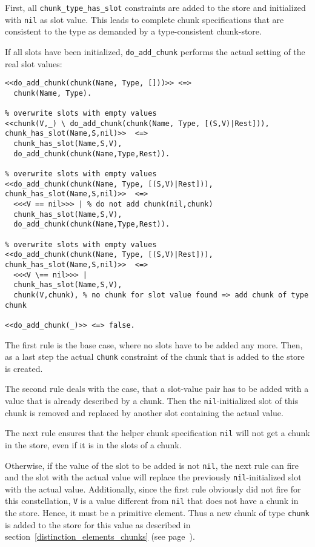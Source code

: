 First, all \lstinline|chunk_type_has_slot| constraints are added to the store and initialized with \lstinline|nil| as slot value. This leads to complete chunk specifications that are consistent to the type as demanded by a type-consistent chunk-store.

If all slots have been initialized, \lstinline|do_add_chunk| performs the actual setting of the real slot values:
  
\begin{lstlisting}[caption={Additional rules for adding chunks}]  
% base case
<<do_add_chunk(chunk(Name, Type, []))>> <=> 
  chunk(Name, Type). 

% overwrite slots with empty values
<<chunk(V,_) \ do_add_chunk(chunk(Name, Type, [(S,V)|Rest])), chunk_has_slot(Name,S,nil)>>  <=>
  chunk_has_slot(Name,S,V), 
  do_add_chunk(chunk(Name,Type,Rest)).

% overwrite slots with empty values  
<<do_add_chunk(chunk(Name, Type, [(S,V)|Rest])), chunk_has_slot(Name,S,nil)>>  <=> 
  <<<V == nil>>> | % do not add chunk(nil,chunk)
  chunk_has_slot(Name,S,V), 
  do_add_chunk(chunk(Name,Type,Rest)).  

% overwrite slots with empty values  
<<do_add_chunk(chunk(Name, Type, [(S,V)|Rest])), chunk_has_slot(Name,S,nil)>>  <=> 
  <<<V \== nil>>> |
  chunk_has_slot(Name,S,V), 
  chunk(V,chunk), % no chunk for slot value found => add chunk of type chunk 
  
<<do_add_chunk(_)>> <=> false.
\end{lstlisting}

The first rule is the base case, where no slots have to be added any more. Then, as a last step the actual \lstinline|chunk| constraint of the chunk that is added to the store is created.

The second rule deals with the case, that a slot-value pair has to be added with a value that is already described by a chunk. Then the \lstinline|nil|-initialized slot of this chunk is removed and replaced by another slot containing the actual value.

The next rule ensures that the helper chunk specification \lstinline|nil| will not get a chunk in the store, even if it is in the slots of a chunk.

Otherwise, if the value of the slot to be added is not \lstinline|nil|, the next rule can fire and the slot with the actual value will replace the previously \lstinline|nil|-initialized slot with the actual value. Additionally, since the first rule obviously did not fire for this constellation, \lstinline|V| is a value different from \lstinline|nil| that does not have a chunk in the store. Hence, it must be a primitive element. Thus a new chunk of type \lstinline|chunk| is added to the store for this value as described in section~\ref{distinction_elements_chunks} (see page~\pageref{distinction_elements_chunks}).

